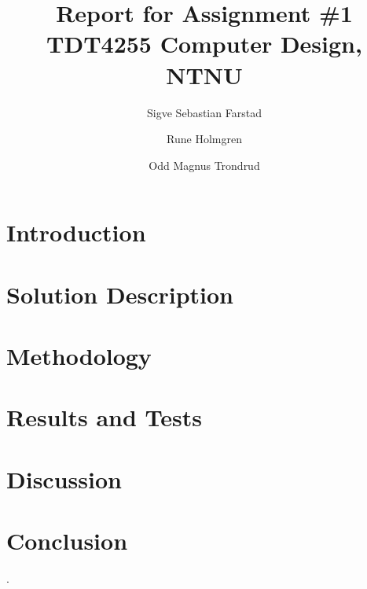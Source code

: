 \documentclass[10pt]{report}
\title{Report for Assignment \#1 \\
TDT4255 Computer Design, NTNU}
\author{Sigve Sebastian Farstad \and
		Rune Holmgren \and
		Odd Magnus Trondrud}
\begin{document}
\maketitle


\begin{abstract}
	
\end{abstract}

\tableofcontents

\listoffigures

\listoftables


\chapter{Introduction}


	

\chapter{Solution Description}
	

\chapter{Methodology}
	

\chapter{Results and Tests}
	

\chapter{Discussion}
	

\chapter{Conclusion}
	

\cite{compendium}.


{}

\nocite{*} %
\end{document}
